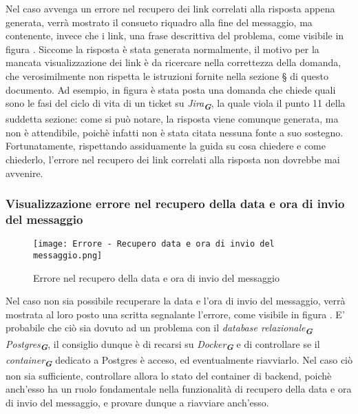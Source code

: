 Nel caso avvenga un errore nel recupero dei link correlati alla risposta appena generata, verrà mostrato il consueto riquadro alla fine del messaggio, ma contenente, invece che i link, una frase descrittiva del problema, come visibile in figura . Siccome la risposta è stata generata normalmente, il motivo per la mancata visualizzazione dei link è da ricercare nella correttezza della domanda, che verosimilmente non rispetta le istruzioni fornite nella sezione \S{} di questo documento. Ad esempio, in figura è stata posta una domanda che chiede quali sono le fasi del ciclo di vita di un ticket su \emph{Jira}\textsubscript{\textbf{\textit{G}}}, la quale viola il punto 11 della suddetta sezione: come si può notare, la risposta viene comunque generata, ma non è attendibile, poichè infatti non è stata citata nessuna fonte a suo sostegno. Fortunatamente, rispettando assiduamente la guida su cosa chiedere e come chiederlo, l'errore nel recupero dei link correlati alla risposta non dovrebbe mai avvenire.


\subsubsection{Visualizzazione errore nel recupero della data e ora di invio del messaggio}

\begin{figure}[h]
    \centering
        \texttt{[image: Errore - Recupero data e ora di invio del messaggio.png]}
        \caption{Errore nel recupero della data e ora di invio del messaggio}
        \label{fig:Errore nel recupero della data e ora di invio del messaggio}
\end{figure}

Nel caso non sia possibile recuperare la data e l'ora di invio del messaggio, verrà mostrata al loro posto una scritta segnalante l'errore, come visibile in figura . E' probabile che ciò sia dovuto ad un problema con il \emph{database relazionale}\textsubscript{\textbf{\textit{G}}} \emph{Postgres}\textsubscript{\textbf{\textit{G}}}, il consiglio dunque è di recarsi su \emph{Docker}\textsubscript{\textbf{\textit{G}}} e di controllare se il \emph{container}\textsubscript{\textbf{\textit{G}}} dedicato a Postgres è acceso, ed eventualmente riavviarlo. Nel caso ciò non sia sufficiente, controllare allora lo stato del container di backend, poichè anch'esso ha un ruolo fondamentale nella funzionalità di recupero della data e ora di invio del messaggio, e provare dunque a riavviare anch'esso.


